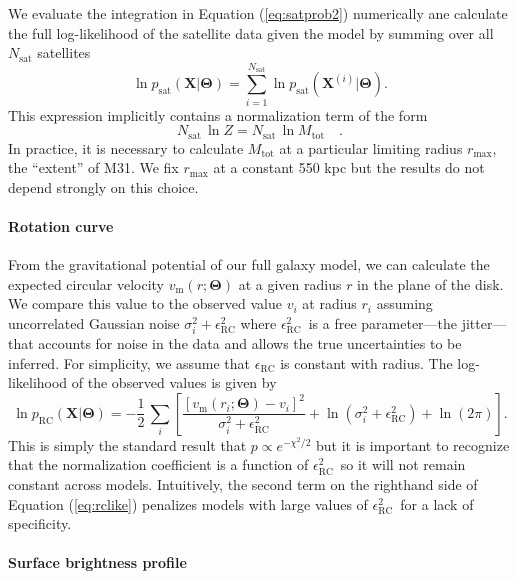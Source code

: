 \documentclass[preprint,12pt]{aastex}
\newcommand{\eqlabel}[1]{\label{eq:#1}}
\newcommand{\eq}[1]{Equation (\ref{eq:#1})}
\newcommand{\bvec}[1]{\ensuremath{\boldsymbol{#1}}}
\renewcommand{\vector}[1]{\ensuremath{\bvec{#1}}}
\newcommand{\model}{\vector{\Theta}}
\newcommand{\data}{\vector{X}}
\newcommand{\prob}{\ensuremath{p}}
\newcommand{\pr}{\prob}
\newcommand{\sat}{\mathrm{sat}}
\newcommand{\rc}{\mathrm{RC}}
\newcommand{\jitter}[1]{\ensuremath{\epsilon_\mathrm{#1}^2}}
\newcommand{\jitterrc}{\jitter{RC}}
\newcommand{\rcmodel}{\ensuremath{v_\mathrm{m}}}
\newcommand{\rcvar}{\ensuremath{\sigma_i^2 + \jitterrc}}
\newcommand{\rcobs}{\ensuremath{v_i}}
\begin{document}
We evaluate the integration in \eq{satprob2}  numerically ane calculate
the full log-likelihood of the satellite data given the model by summing
over all $N_\sat$ satellites
\begin{equation}
    \ln \pr_\sat (\data | \model)
        = \sum_{i=1}^{N_\sat} \ln \pr_\sat (\data^{(i)} | \model).
\end{equation}
This expression implicitly contains a normalization term of the form
\begin{equation}
    N_\sat \, \ln Z = N_\sat \, \ln M_\mathrm{tot} \quad .
\end{equation}
In practice, it is necessary to calculate $M_\mathrm{tot}$ at a particular
limiting radius $r_\mathrm{max}$, the ``extent'' of M31. We fix
$r_\mathrm{max}$ at a constant 550 kpc but the results do not depend
strongly on this choice.

\paragraph{Rotation curve}

From the gravitational potential of our full galaxy model, we can calculate
the expected circular velocity $\rcmodel (r; \model)$ at a given radius
$r$ in the plane of the disk. We compare this value to the observed value
$v_i$ at radius $r_i$ assuming uncorrelated Gaussian noise
$\rcvar$ where \jitterrc\
is a free parameter---the jitter---that accounts for noise in the data and
allows the true uncertainties to be inferred.  For simplicity, we assume that
$\epsilon_\mathrm{RC}$ is constant with radius.  The log-likelihood of the
observed values is given by
\begin{equation}
    \eqlabel{rclike}
    \ln \pr_\rc (\data | \model) = - \frac{1}{2} \, \sum_i
        \left [ \frac{[ \rcmodel (r_i; \model) - \rcobs]^2}{\rcvar}
            + \ln (\rcvar) + \ln (2 \pi) \right ].
\end{equation}
This is simply the standard result that $\pr \propto e^{-\chi^2/2}$ but it is
important to recognize that the normalization coefficient is a function of
\jitterrc\ so it will not remain constant across models.
Intuitively, the second term on the righthand side of \eq{rclike} penalizes
models with large values of \jitterrc\ for a lack of specificity.

\paragraph{Surface brightness profile}
\end{document}
